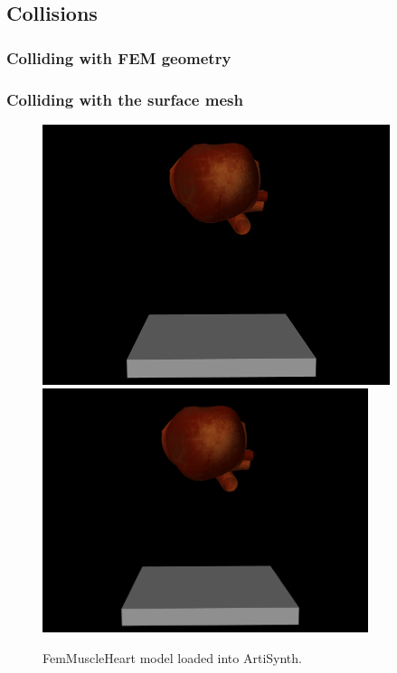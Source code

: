 
\subsection{Collisions}

\subsubsection{Colliding with FEM geometry}

\subsubsection{Colliding with the surface mesh}

\begin{figure}[ht]
\begin{center}
\iflatexml
 \includegraphics[]{images/FemMuscleHeart}
\else
 \includegraphics[width=3.75in]{images/FemMuscleHeart}
\fi
\end{center}
\caption{FemMuscleHeart model loaded into ArtiSynth.}
\label{FemMuscleHeart:fig}
\end{figure}

